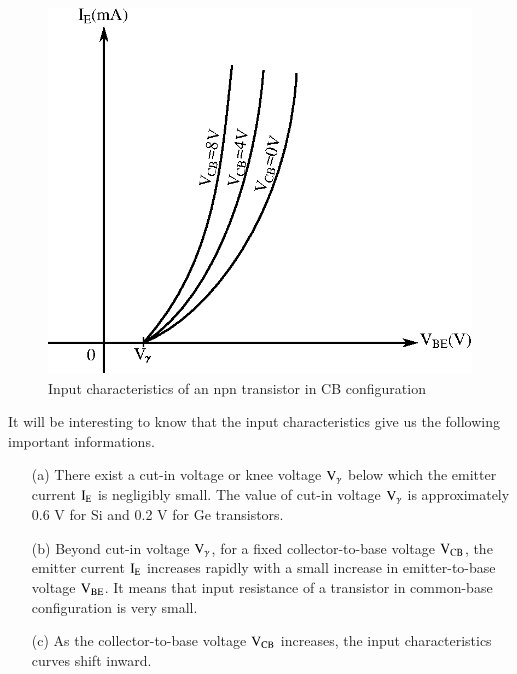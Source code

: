 \smallskip
\begin{figure}[H]
\centering
\includegraphics{chap2/fig12.eps}
\caption{Input characteristics of an npn transistor in CB configuration}\label{fig2.12}
\end{figure}

\smallskip
It will be interesting to know that the input characteristics give us the following important informations.
\begin{itemize}
\item[(a)] There exist a cut-in voltage or knee voltage $\textrm{V}_{\gamma}$ below which the emitter current $\textrm{I}_{\textrm{E}}$ is negligibly small. The value of cut-in voltage $\textrm{V}_{\gamma}$ is approximately 0.6 V for Si and 0.2 V for Ge transistors.

\item[(b)] Beyond cut-in voltage $\textrm{V}_{\gamma}$, for a fixed collector-to-base voltage $\textrm{V}_{\text{CB}}$, the emitter current $\textrm{I}_{\textrm{E}}$ increases rapidly with a small increase in emitter-to-base voltage $\textrm{V}_{\text{BE}}$. It means that input resistance of a transistor in common-base configuration is very small.

\item[(c)] As the collector-to-base voltage $\textrm{V}_{\text{CB}}$ increases, the input characteristics curves shift inward.
\end{itemize}

\newpage

